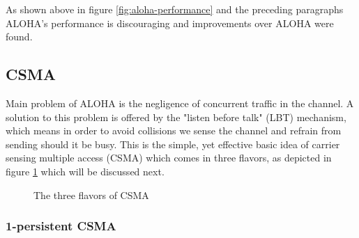 As shown above in figure \ref{fig:aloha-performance} and the preceding paragraphs ALOHA's performance is discouraging and improvements over ALOHA were found. 

\subsection{CSMA}

Main problem of ALOHA is the negligence of concurrent traffic in the channel. A solution to this problem is offered by the "listen before talk" (LBT) mechanism, which means in order to avoid collisions we sense the channel and refrain from sending should it be busy. This is the simple, yet effective basic idea of carrier sensing multiple access (CSMA) which comes in three flavors, as depicted in figure \ref{fig:csma-flavors} which will be discussed next.

\begin{figure}[htp] \label{fig:csma-flavors}
	\begin{center}
		\qquad
		\qquad
	\end{center}
\caption{The three flavors of CSMA}
\end{figure}


\subsubsection{1-persistent CSMA}

